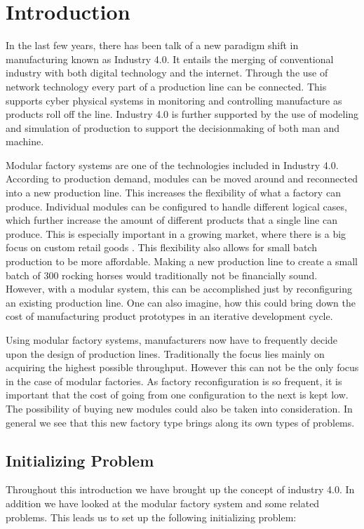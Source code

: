 \chapter{Introduction}
\label{ch:introduction}
In the last few years, there has been talk of a new paradigm shift in manufacturing known as Industry 4.0. It entails the merging of conventional industry with both digital technology and the internet. Through the use of network technology every part of a production line can be connected. This supports cyber physical systems in monitoring and controlling manufacture as products roll off the line. Industry 4.0 is further supported by the use of modeling and simulation of production to support the decisionmaking of both man and machine. \cite{Davis2015}

Modular factory systems are one of the technologies included in Industry 4.0. According to production demand, modules can be moved around and reconnected into a new production line. This increases the flexibility of what a factory can produce. Individual modules can be configured to handle different logical cases, which further increase the amount of different products that a single line can produce. This is especially important in a growing market, where there is a big focus on custom retail goods \cite{Spaulding2013}.  This flexibility also allows for small batch production to be more affordable.  Making a new production line to create a small batch of 300 rocking horses would traditionally not be financially sound. However, with a modular system, this can be accomplished just by reconfiguring an existing production line. One can also imagine, how this could bring down the cost of manufacturing product prototypes in an iterative development cycle.

Using modular factory systems, manufacturers now have to frequently decide upon the design of production lines. Traditionally the focus lies mainly on acquiring the highest possible throughput. However this can not be the only focus in the case of modular factories.  As factory reconfiguration is so frequent, it is important that the cost of going from one configuration to the next is kept low.  The possibility of buying new modules could also be taken into consideration. In general we see that this new factory type brings along its own types of problems.

\section{Initializing Problem}
Throughout this introduction we have brought up the concept of industry 4.0. In addition we have looked at the modular factory system and some related problems. This leads us to set up the following initializing problem:


